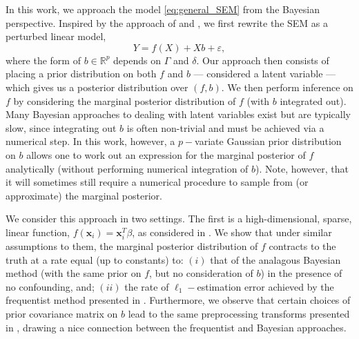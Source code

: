 \documentclass[11pt]{article}
\newcommand{\eps}{\varepsilon}
\newcommand{\R}{\mathbb{R}}
\begin{document}
In this work, we approach the model \eqref{eq:general_SEM} from the Bayesian perspective. Inspired by the approach of \cite{CBM2020} and \cite{Chernozhukov2017}, we first rewrite the SEM as a perturbed linear model,
\begin{equation}
Y = f(X) + X b + \eps, \label{eq:nl_f_l_g}
\end{equation}
where the form of $b \in \R^p$ depends on $\Gamma$ and $\delta$.
Our approach then consists of placing a prior distribution on both $f$ and $b$ --- considered a latent variable --- which gives us a posterior distribution over $(f, b)$. We then perform inference on $f$ by considering the marginal posterior distribution of $f$ (with $b$ integrated out). Many Bayesian approaches to dealing with latent variables exist but are typically slow, since integrating out $b$ is often non-trivial and must be achieved via a numerical step. In this work, however, a $p-$variate Gaussian prior distribution on $b$ allows one to work out an expression for the marginal posterior of $f$ analytically (without performing numerical integration of $b$). Note, however, that it will sometimes still require a numerical procedure to sample from (or approximate) the marginal posterior.

We consider this approach in two settings. The first is a high-dimensional, sparse, linear function, $f(\mathbf{x}_i) = \mathbf{x}_i^T \beta$, as considered in \cite{CBM2020}. We show that under similar assumptions to them, the marginal posterior distribution of $f$ contracts to the truth at a rate equal (up to constants) to: $(i)$ that of the analagous Bayesian method (with the same prior on $f$, but no consideration of $b$) in the presence of no confounding, and; $(ii)$ the rate of $\ell_1-$estimation error achieved by the frequentist method presented in \cite{CBM2020}. Furthermore, we observe that certain choices of prior covariance matrix on $b$ lead to the same preprocessing transforms presented in \cite{CBM2020}, drawing a nice connection between the frequentist and Bayesian approaches.
\end{document}
